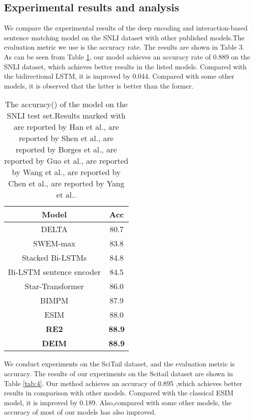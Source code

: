 \documentclass[review]{elsarticle}
\begin{document}
\subsection{Experimental results and analysis}
We compare the experimental results of the deep encoding and interaction-based sentence matching model on the SNLI dataset with other published models.The evaluation metric we use is the accuracy rate. The results are shown in Table 3. As can be seen from Table \ref{tab:3}, our model achieves an accuracy rate of 0.889 on the SNLI dataset, which achieves better results in the listed models. Compared with the bidirectional LSTM, it is improved by 0.044. Compared with some other models, 
it is observed that the latter is better than the former.
\begin{table}[htbp]
 \centering
  \caption{\label{tab:3}The accuracy() of the model on the SNLI test  set.Results marked with     are reported by Han et al.\cite{han2019delta},   are reported by Shen et al.\cite{shen2018baseline},  are reported by Borges et al.\cite{borges2019combining},  are reported by Guo et al.\cite{guo2019star},  are reported by Wang et al.\cite{wang2017bilateral},  are reported by Chen et al.\cite{chen2017enhanced},  are reported by Yang et al.\cite{yang2019simple}.}
\begin{tabular}{cc}
 \toprule
Model & Acc\\
 \midrule
DELTA & 80.7 \\
SWEM-max & 83.8 \\
Stacked Bi-LSTMs & 84.8 \\
Bi-LSTM sentence encoder & 84.5 \\
Star-Transformer & 86.0 \\
BIMPM & 87.9 \\
ESIM & 88.0 \\
\textbf{RE2} & \textbf{88.9} \\
\textbf{DEIM} & \textbf{88.9} \\
\bottomrule
 \end{tabular}
\end{table}
We conduct experiments on the SciTail dataset, and the evaluation metric is accuracy.
The results of our experiments on the Scitail dataset are shown in Table \ref{tab:4}. Our method achieves an accuracy of 0.895 ,which achieves better results in comparison with other models. Compared with the classical ESIM model, it is improved by 0.189. Also,compared with some other models, 
the accuracy of most of our models has also improved.  
\end{document}
